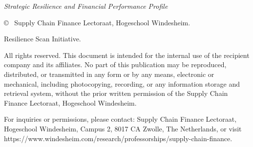 
\null\vfill
\begin{flushleft}
\thispagestyle{empty}
\textit{Strategic Resilience and Financial Performance Profile}

\vspace{1em} %

\noindent © \the\year\ Supply Chain Finance Lectoraat, Hogeschool Windesheim.

\vspace{0.5em}

\noindent Resilience Scan Initiative.

\vspace{1em}

\noindent All rights reserved. This document is intended for the internal use of the recipient company and its affiliates. No part of this publication may be reproduced, distributed, or transmitted in any form or by any means, electronic or mechanical, including photocopying, recording, or any information storage and retrieval system, without the prior written permission of the Supply Chain Finance Lectoraat, Hogeschool Windesheim.

\vspace{0.5em}

\noindent For inquiries or permissions, please contact: Supply Chain Finance Lectoraat, Hogeschool Windesheim, Campus 2, 8017 CA Zwolle, The Netherlands, or visit https://www.windesheim.com/research/professorships/supply-chain-finance.

\vspace{0.5em}

\end{flushleft}

